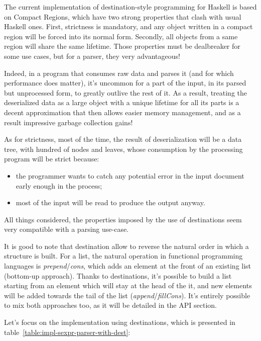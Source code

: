 \documentclass[english]{jflart}
\begin{document}
The current implementation of destination-style programming for Haskell is based on Compact Regions, which have two strong properties that clash with usual Haskell ones. First, strictness is mandatory, and any object written in a compact region will be forced into its normal form. Secondly, all objects from a same region will share the same lifetime. Those properties must be dealbreaker for some use cases, but for a parser, they very advantageous!

Indeed, in a program that consumes raw data and parses it (and for which performance does matter), it's uncommon for a part of the input, in its parsed but unprocessed form, to greatly outlive the rest of it. As a result, treating the deserialized data as a large object with a unique lifetime for all its parts is a decent approximation that then allows easier memory management, and as a result impressive garbage collection gains!

As for strictness, most of the time, the result of deserialization will be a data tree, with hundred of nodes and leaves, whose consumption by the processing program will be strict because:
\begin{itemize}
  \item the programmer wants to catch any potential error in the input document early enough in the process;
  \item most of the input will be read to produce the output anyway.
\end{itemize}

All things considered, the properties imposed by the use of destinations seem very compatible with a parsing use-case.

It is good to note that destination allow to reverse the natural order in which a structure is built. For a list, the natural operation in functional programming languages is \emph{prepend}/\emph{cons}, which adds an element at the front of an existing list (bottom-up approach). Thanks to destinations, it's possible to build a list starting from an element which will stay at the head of the it, and new elements will be added towards the tail of the list (\emph{append}/\emph{fillCons}). It's entirely possible to mix both approaches too, as it will be detailed in the API section.

Let's focus on the implementation using destinations, which is presented in table~\ref{table:impl-sexpr-parser-with-dest}:

\newcommand{\mnew}[1]{\colorbox{green}{#1}}
\newcommand{\mold}[1]{\colorbox{red}{\sout{#1}}}
\end{document}
